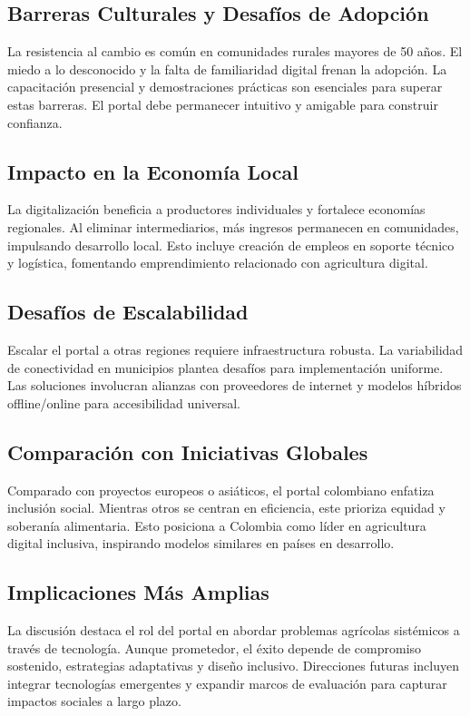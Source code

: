 \subsection{Barreras Culturales y Desafíos de Adopción}

La resistencia al cambio es común en comunidades rurales mayores de 50 años. El miedo a lo desconocido y la falta de familiaridad digital frenan la adopción. La capacitación presencial y demostraciones prácticas son esenciales para superar estas barreras. El portal debe permanecer intuitivo y amigable para construir confianza.
\subsection{Impacto en la Economía Local}

La digitalización beneficia a productores individuales y fortalece economías regionales. Al eliminar intermediarios, más ingresos permanecen en comunidades, impulsando desarrollo local. Esto incluye creación de empleos en soporte técnico y logística, fomentando emprendimiento relacionado con agricultura digital.
\subsection{Desafíos de Escalabilidad}

Escalar el portal a otras regiones requiere infraestructura robusta. La variabilidad de conectividad en municipios plantea desafíos para implementación uniforme. Las soluciones involucran alianzas con proveedores de internet y modelos híbridos offline/online para accesibilidad universal.
\subsection{Comparación con Iniciativas Globales}

Comparado con proyectos europeos o asiáticos, el portal colombiano enfatiza inclusión social. Mientras otros se centran en eficiencia, este prioriza equidad y soberanía alimentaria. Esto posiciona a Colombia como líder en agricultura digital inclusiva, inspirando modelos similares en países en desarrollo.
\subsection{Implicaciones Más Amplias}

La discusión destaca el rol del portal en abordar problemas agrícolas sistémicos a través de tecnología. Aunque prometedor, el éxito depende de compromiso sostenido, estrategias adaptativas y diseño inclusivo. Direcciones futuras incluyen integrar tecnologías emergentes y expandir marcos de evaluación para capturar impactos sociales a largo plazo.
